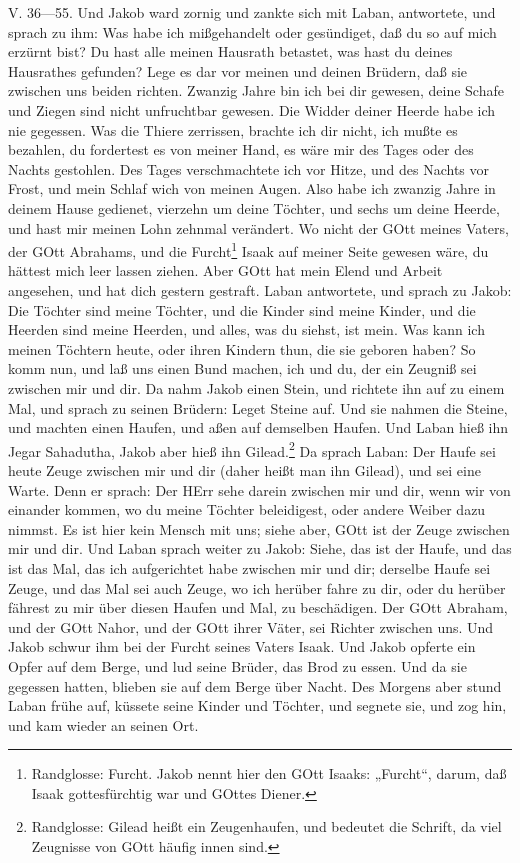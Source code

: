 V. 36—55. Und Jakob ward zornig und zankte sich mit Laban, antwortete, und sprach zu ihm: Was habe ich mißgehandelt oder gesündiget, daß du so auf mich erzürnt bist? Du hast alle meinen Hausrath betastet, was hast du deines Hausrathes gefunden? Lege es dar vor meinen und deinen Brüdern, daß sie zwischen uns beiden richten. Zwanzig Jahre bin ich bei dir gewesen, deine Schafe und Ziegen sind nicht unfruchtbar gewesen. Die Widder deiner Heerde habe ich nie gegessen. Was die Thiere zerrissen, brachte ich dir nicht, ich mußte es bezahlen, du fordertest es von meiner Hand, es wäre mir des Tages oder des Nachts gestohlen. Des Tages verschmachtete ich vor Hitze, und des Nachts vor Frost, und mein Schlaf wich von meinen Augen. Also habe ich zwanzig Jahre in deinem Hause gedienet, vierzehn um deine Töchter, und sechs um deine Heerde, und hast mir meinen Lohn zehnmal verändert. Wo nicht der GOtt meines Vaters, der GOtt Abrahams, und die Furcht\footnote{Randglosse: Furcht. Jakob nennt hier den GOtt Isaaks: „Furcht“, darum, daß Isaak gottesfürchtig war und GOttes Diener.} Isaak auf meiner Seite gewesen wäre, du hättest mich leer lassen ziehen. Aber GOtt hat mein Elend und Arbeit angesehen, und hat dich gestern gestraft. Laban antwortete, und sprach zu Jakob: Die Töchter sind meine Töchter, und die Kinder sind meine Kinder, und die Heerden sind meine Heerden, und alles, was du siehst, ist mein. Was kann ich meinen Töchtern heute, oder ihren Kindern thun, die sie geboren haben? So komm nun, und laß uns einen Bund machen, ich und du, der ein Zeugniß sei zwischen mir und dir. Da nahm Jakob einen Stein, und richtete ihn auf zu einem Mal, und sprach zu seinen Brüdern: Leget Steine auf. Und sie nahmen die Steine, und machten einen Haufen, und aßen auf demselben Haufen. Und Laban hieß ihn Jegar Sahadutha, Jakob aber hieß ihn Gilead.\footnote{Randglosse: Gilead heißt ein Zeugenhaufen, und bedeutet die Schrift, da viel Zeugnisse von GOtt häufig innen sind.} Da sprach Laban: Der Haufe sei heute Zeuge zwischen mir und dir (daher heißt man ihn Gilead), und sei eine Warte. Denn er sprach: Der HErr sehe darein zwischen mir und dir, wenn wir von einander kommen, wo du meine Töchter beleidigest, oder andere Weiber dazu nimmst. Es ist hier kein Mensch mit uns; siehe aber, GOtt ist der Zeuge zwischen mir und dir. Und Laban sprach weiter zu Jakob: Siehe, das ist der Haufe, und das ist das Mal, das ich aufgerichtet habe zwischen mir und dir; derselbe Haufe sei Zeuge, und das Mal sei auch Zeuge, wo ich herüber fahre zu dir, oder du herüber fährest zu mir über diesen Haufen und Mal, zu beschädigen. Der GOtt Abraham, und der GOtt Nahor, und der GOtt ihrer Väter, sei Richter zwischen uns. Und Jakob schwur ihm bei der Furcht seines Vaters Isaak. Und Jakob opferte ein Opfer auf dem Berge, und lud seine Brüder, das Brod zu essen. Und da sie gegessen hatten, blieben sie auf dem Berge über Nacht. Des Morgens aber stund Laban frühe auf, küssete seine Kinder und Töchter, und segnete sie, und zog hin, und kam wieder an seinen Ort.

